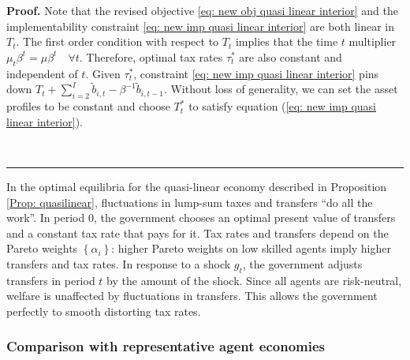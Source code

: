 \documentclass[thmsb,11pt]{article}
\newenvironment{proof}[1][Proof]{\noindent \textbf{#1.} }{\  \rule{0.5em}{0.5em}}
\begin{document}
\begin{proof}
Note that the revised objective \eqref{eq: new obj quasi linear interior} and the implementability constraint \eqref{eq: new imp quasi linear interior} are both  linear in $T_t$. The first order condition with respect to $T_t$  implies that the time $t$ multiplier $\mu_t\beta^t=\mu\beta^t \quad \forall t$.  Therefore, optimal tax rates $\tau _{t}^{\ast }$ are
also constant and independent of $t.$ Given $\tau^*_t$, constraint \eqref{eq: new imp quasi linear interior} pins down $T_t +\sum_{i=2}^{I}\tilde{b}_{i,t}-\beta^{-1}\tilde{b}_{i,t-1}$.  Without loss of generality, we can set the asset profiles to be constant and choose $T^*_t$ to satisfy equation (\ref{eq: new imp quasi linear interior}).





\end{proof}

\smallskip In the optimal equilibria for the quasi-linear economy described in Proposition \ref{Prop: quasilinear}, fluctuations in lump-sum taxes and
transfers ``do all the work''. In period 0, the government chooses an optimal
present value of transfers and a constant tax rate that pays for it. Tax rates  and transfers depend on the Pareto weights $\left\{ \alpha
_{i}\right\} $:  higher Pareto weights on low skilled agents imply
higher transfers and tax rates. In response to a shock $g_{t}$, the
government adjusts transfers in period $t$ by the amount of the shock. Since
all agents are risk-neutral,  welfare is unaffected by
fluctuations in transfers. This allows the government  perfectly to  smooth distorting tax rates.

\smallskip

\subsubsection{Comparison with representative agent economies} \label{sec: comp with AMSS}
\end{document}
